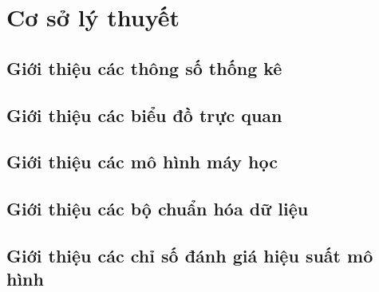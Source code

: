 \chapter{Cơ sở lý thuyết} \label{chapt:basis}

\startcontents[chapters]

\section{Giới thiệu các thông số thống kê} \label{sec:basis-tstk}


\section{Giới thiệu các biểu đồ trực quan} \label{sec:basis-graph}


\section{Giới thiệu các mô hình máy học} \label{sec:basis-model}


\section{Giới thiệu các bộ chuẩn hóa dữ liệu} \label{sec:basis-scaler}


\section{Giới thiệu các chỉ số đánh giá hiệu suất mô hình}
